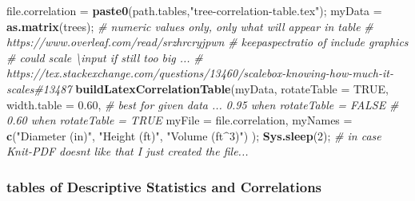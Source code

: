 \documentclass[]{article}
\newenvironment{Shaded}{\begin{snugshade}}{\end{snugshade}}
\newcommand{\CommentTok}[1]{\textcolor[rgb]{0.56,0.35,0.01}{\textit{#1}}}
\newcommand{\DataTypeTok}[1]{\textcolor[rgb]{0.13,0.29,0.53}{#1}}
\newcommand{\DecValTok}[1]{\textcolor[rgb]{0.00,0.00,0.81}{#1}}
\newcommand{\FloatTok}[1]{\textcolor[rgb]{0.00,0.00,0.81}{#1}}
\newcommand{\KeywordTok}[1]{\textcolor[rgb]{0.13,0.29,0.53}{\textbf{#1}}}
\newcommand{\NormalTok}[1]{#1}
\newcommand{\OtherTok}[1]{\textcolor[rgb]{0.56,0.35,0.01}{#1}}
\newcommand{\StringTok}[1]{\textcolor[rgb]{0.31,0.60,0.02}{#1}}
\begin{document}
\begin{Shaded}
\begin{Highlighting}[]
\NormalTok{file.correlation =}\StringTok{ }\KeywordTok{paste0}\NormalTok{(path.tables,}\StringTok{"tree{-}correlation{-}table.tex"}\NormalTok{);}
\NormalTok{myData =}\StringTok{ }\KeywordTok{as.matrix}\NormalTok{(trees);  }\CommentTok{\# numeric values only, only what will appear in table}
\CommentTok{\# https://www.overleaf.com/read/srzhrcryjpwn}
\CommentTok{\# keepaspectratio of include graphics }
\CommentTok{\# could scale \textbackslash{}input if still too big ...}
\CommentTok{\# https://tex.stackexchange.com/questions/13460/scalebox{-}knowing{-}how{-}much{-}it{-}scales\#13487}
\KeywordTok{buildLatexCorrelationTable}\NormalTok{(myData, }
  \DataTypeTok{rotateTable =} \OtherTok{TRUE}\NormalTok{,}
  \DataTypeTok{width.table =} \FloatTok{0.60}\NormalTok{, }\CommentTok{\# best for given data ... 0.95 when rotateTable = FALSE}
                      \CommentTok{\# 0.60 when rotateTable = TRUE}
  \DataTypeTok{myFile =}\NormalTok{ file.correlation,}
  \DataTypeTok{myNames =} \KeywordTok{c}\NormalTok{(}\StringTok{"Diameter (in)"}\NormalTok{, }\StringTok{"Height (ft)"}\NormalTok{, }\StringTok{"Volume (ft$\^{}3$)"}\NormalTok{) );}
\KeywordTok{Sys.sleep}\NormalTok{(}\DecValTok{2}\NormalTok{); }\CommentTok{\# in case Knit{-}PDF doesn\textquotesingle{}t like that I just created the file...}
\end{Highlighting}
\end{Shaded}

\newpage



\newpage

\subsubsection{tables of Descriptive Statistics and Correlations}
\label{sec:correlation-tables}

\end{document}
